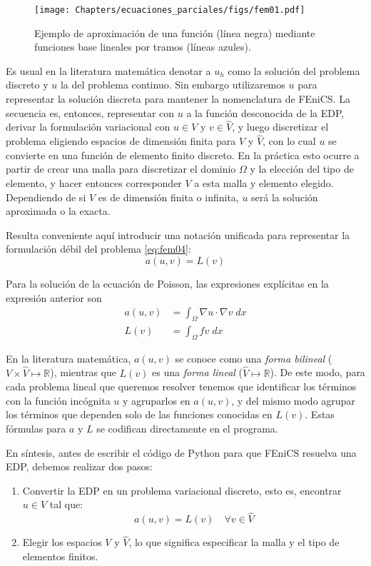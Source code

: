 \begin{figure}[ht]
 \centering
 \texttt{[image: Chapters/ecuaciones\_parciales/figs/fem01.pdf]}
 \caption{Ejemplo de aproximación de una función (línea negra) mediante funciones base lineales por tramos (líneas azules).}
 \label{fig:fem01}
\end{figure}

Es usual en la literatura matemática denotar a $u_h$ como la solución del problema discreto y $u$ la del problema continuo. Sin embargo utilizaremos $u$ para representar la solución discreta para mantener la nomenclatura de FEniCS. La secuencia es, entonces, representar con $u$ a la función desconocida de la EDP, derivar la formulación variacional con $u \in V$ y $v \in \hat{V}$, y luego discretizar el problema eligiendo espacios de dimensión finita para $V$ y $\hat{V}$, con lo cual $u$ se convierte en una función de elemento finito discreto. En la práctica esto ocurre a partir de crear una malla para discretizar el dominio $\Omega$ y la elección del tipo de elemento, y hacer entonces corresponder $V$ a esta malla y elemento elegido. Dependiendo de si $V$ es de dimensión finita o infinita, $u$ será la solución aproximada o la exacta.

Resulta conveniente aquí introducir una notación unificada para representar la formulación débil del problema \eqref{eq:fem04}:
\begin{equation}\label{eq:fem-debil}
a(u, v) = L(v)
\end{equation}

Para la solución de la ecuación de Poisson, las expresiones explícitas en la expresión anterior son
\begin{align}
 a(u, v) &= \int_{\Omega} \nabla u \cdot \nabla v \; dx \label{eq:fembilineal} \\
 L(v) &= \int_{\Omega} f v \; dx \label{eq:femlineal} 
\end{align}

En la literatura matemática, $a(u, v)$ se conoce como una \textit{forma bilineal} ($V \times \hat{V} \mapsto \mathbb{R}$), mientras que $L(v)$ es una \textit{forma lineal} ($\hat{V} \mapsto \mathbb{R}$). De este modo, para cada problema lineal que queremos resolver tenemos que identificar los términos con la función incógnita $u$ y agruparlos en $a(u, v)$, y del mismo modo agrupar los términos que dependen solo de las funciones conocidas en $L(v)$. Estas fórmulas para $a$ y $L$ se codifican directamente en el programa.

En síntesis, antes de escribir el código de Python para que FEniCS resuelva una EDP, debemos realizar dos pasos:
\begin{enumerate}
 \item Convertir la EDP en un problema variacional discreto, esto es, encontrar $u \in V$ tal que:
 \begin{equation}
  a(u, v) = L(v) \quad \forall v \in \hat{V}
 \end{equation} 
 \item Elegir los espacios $V$ y $\hat{V}$, lo que significa especificar la malla y el tipo de elementos finitos.
\end{enumerate}

